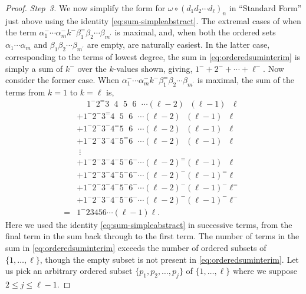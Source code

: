\documentclass[5p,twocolumn]{elsarticle}
\begin{document}
\begin{proof}
  \emph{Step~3.} We now simplify the form for $\omega\circ(d_1d_2\cdots d_\ell)_n$ in ``Standard Form'' just above using the identity \eqref{eq:sum-simpleabstract}.
  The extremal cases of when the term $\alpha_1^-\cdots\alpha_m^-k^-\beta_1^=\beta_2\cdots\beta_{m^\prime}$ is maximal, and, when both the ordered sets $\alpha_1\cdots\alpha_m$ and $\beta_1\beta_2\cdots\beta_{m^\prime}$
  are empty, are naturally easiest. In the latter case, corresponding to the terms of lowest degree, the sum in \eqref{eq:orderedsuminterim} is simply a sum of $k^-$ over the $k$-values shown, giving, $1^-+2^-+\cdots+\ell^-$.  
  Now consider the former case. When $\alpha_1^-\cdots\alpha_m^-k^-\beta_1^=\beta_2\cdots\beta_{m^\prime}$ is maximal, the sum of the terms from $k=1$ to $k=\ell$ is,
  \begin{align}
   &\phantom{+}1^-2^=3\phantom{^-}4\phantom{^-}5\phantom{^-}6\phantom{^-}\cdots(\ell-2)\phantom{^-}(\ell-1)\phantom{^-}\ell\phantom{^-}\nonumber\\
   &+1^-2^-3^=4\phantom{^-}5\phantom{^-}6\phantom{^-}\cdots(\ell-2)\phantom{^-}(\ell-1)\phantom{^-}\ell\phantom{^-}\nonumber\\
   &+1^-2^-3^-4^=5\phantom{^-}6\phantom{^-}\cdots(\ell-2)\phantom{^-}(\ell-1)\phantom{^-}\ell\phantom{^-}\nonumber\\
   &+1^-2^-3^-4^-5^=6\phantom{^-}\cdots(\ell-2)\phantom{^-}(\ell-1)\phantom{^-}\ell\phantom{^-}\nonumber\\
    &\;\vdots\nonumber\\
   &+1^-2^-3^-4^-5^-6^-\cdots(\ell-2)^=(\ell-1)\phantom{^-}\ell\phantom{^-}\nonumber\\
   &+1^-2^-3^-4^-5^-6^-\cdots(\ell-2)^-(\ell-1)^=\ell\phantom{^-}\nonumber\\
   &+1^-2^-3^-4^-5^-6^-\cdots(\ell-2)^-(\ell-1)^-\ell^=\nonumber\\
   &+1^-2^-3^-4^-5^-6^-\cdots(\ell-2)^-(\ell-1)^-\ell^-\nonumber\\
   =&1^-23456\cdots(\ell-1)\ell.\label{eq:interimresult}
  \end{align}
  Here we used the identity \eqref{eq:sum-simpleabstract} in successive terms, from the final term in the sum back through to the first term. 
  The number of terms in the sum in \eqref{eq:orderedsuminterim} exceeds the number of ordered subsets of $\{1,\ldots,\ell\}$, though the empty subset is not present in \eqref{eq:orderedsuminterim}.
  Let us pick an arbitrary ordered subset $\{p_1,p_2,\ldots,p_j\}$ of $\{1,\ldots,\ell\}$ where we suppose $2\leqslant j\leqslant\ell-1$.

\end{proof}
\end{document}
